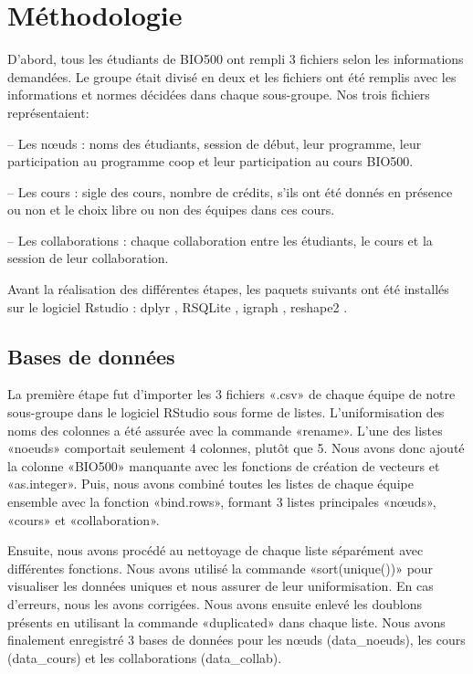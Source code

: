 \documentclass[12pt]{article}
\begin{document}
\section*{\large Méthodologie\vspace{-0.1cm}}
D’abord, tous les étudiants de BIO500 ont rempli 3 fichiers selon les informations demandées. Le groupe était divisé en deux et les fichiers ont été remplis avec les informations et normes décidées dans chaque sous-groupe. Nos trois fichiers représentaient: 
\par – Les nœuds : noms des étudiants, session de début, leur programme, leur participation au programme coop et leur participation au cours BIO500.
\par – Les cours : sigle des cours, nombre de crédits, s’ils ont été donnés en présence ou non et le choix libre ou non des équipes dans ces cours.
\par – Les collaborations : chaque collaboration entre les étudiants, le cours et la session de leur collaboration. 
\par Avant la réalisation des différentes étapes, les paquets suivants ont été installés sur le logiciel Rstudio : dplyr \citep{wickham2021}, RSQLite \citep{muller2021}, igraph \citep{csardi2006}, reshape2 \citep{wickam2007}.

\subsection*{\small Bases de données\vspace{-0.1cm}}
La première étape fut d’importer les 3 fichiers «.csv» de chaque équipe de notre sous-groupe dans le logiciel RStudio sous forme de listes. L'uniformisation des noms des colonnes a été assurée avec la commande «rename». L’une des listes «noeuds» comportait seulement 4 colonnes, plutôt que 5. Nous avons donc ajouté la colonne «BIO500» manquante avec les fonctions de création de vecteurs et «as.integer». Puis, nous avons combiné toutes les listes de chaque équipe ensemble avec la fonction «bind.rows», formant 3 listes principales «nœuds», «cours» et «collaboration». 
\par Ensuite, nous avons procédé au nettoyage de chaque liste séparément avec différentes fonctions. Nous avons utilisé la commande «sort(unique())» pour visualiser les données uniques et nous assurer de leur uniformisation. En cas d’erreurs, nous les avons corrigées. Nous avons ensuite enlevé les doublons présents en utilisant la commande «duplicated» dans chaque liste. Nous avons finalement enregistré 3 bases de données pour les nœuds (data\_noeuds), les cours (data\_cours) et les collaborations (data\_collab).
\end{document}
